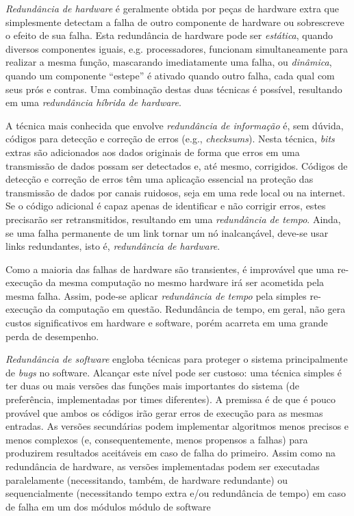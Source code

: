 \emph{Redundância de hardware} é geralmente obtida por peças de hardware extra que simplesmente detectam a falha de outro componente de hardware ou sobrescreve o efeito de sua falha. Esta redundância de hardware pode ser \emph{estática}, quando diversos componentes iguais, e.g. processadores, funcionam simultaneamente para realizar a mesma função, mascarando imediatamente uma falha, ou \emph{dinâmica}, quando um componente ``estepe'' é ativado quando outro falha, cada qual com seus prós e contras. Uma combinação destas duas técnicas é possível, resultando em uma \emph{redundância híbrida de hardware}.

A técnica mais conhecida que envolve \emph{redundância de informação} é, sem dúvida, códigos para detecção e correção de erros (e.g., \emph{checksums}). Nesta técnica, \emph{bits} extras são adicionados aos dados originais de forma que erros em uma transmissão de dados possam ser detectados e, até mesmo, corrigidos. Códigos de detecção e correção de erros têm uma aplicação essencial na proteção das transmissão de dados por canais ruidosos, seja em uma rede local ou na internet. Se o código adicional é capaz apenas de identificar e não corrigir erros, estes precisarão ser retransmitidos, resultando em uma \emph{redundância de tempo}. Ainda, se uma falha permanente de um link tornar um nó inalcançável, deve-se usar links redundantes, isto é, \emph{redundância de hardware}.

Como a maioria das falhas de hardware são transientes, é improvável que uma re-execução da mesma computação no mesmo hardware irá ser acometida pela mesma falha. Assim, pode-se aplicar \emph{redundância de tempo} pela simples re-execução da computação em questão. Redundância de tempo, em geral, não gera custos significativos em hardware e software, porém acarreta em uma grande perda de desempenho.

\emph{Redundância de software} engloba técnicas para proteger o sistema principalmente de \emph{bugs} no software. Alcançar este nível pode ser custoso: uma técnica simples é ter duas ou mais versões das funções mais importantes do sistema (de preferência, implementadas por times diferentes). A premissa é de que é pouco provável que ambos os códigos irão gerar erros de execução para as mesmas entradas. As versões secundárias podem implementar algoritmos menos precisos e menos complexos (e, consequentemente, menos propensos a falhas) para produzirem resultados aceitáveis em caso de falha do primeiro. Assim como na redundância de hardware, as versões implementadas podem ser executadas paralelamente (necessitando, também, de hardware redundante) ou sequencialmente (necessitando tempo extra e/ou redundância de tempo) em caso de falha em um dos módulos módulo de software

